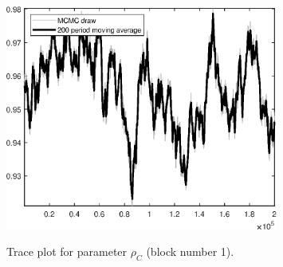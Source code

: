 \begin{figure}[H]
\centering
  \includegraphics[width=0.8\textwidth]{RBC_growth/graphs/TracePlot_rho_C_blck_1}\\
    \caption{Trace plot for parameter ${\rho_C}$ (block number 1).}
\end{figure}
